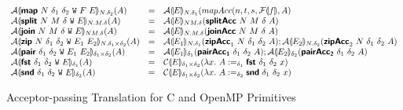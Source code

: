 \begin{figure}
\begin{displaymath}
\begin{array}{lcl}
      \mathcal{A}\llparenthesis \bm{\mathsf{map}}~N~\delta_1~\delta_2~\mathtt{W}~F~E \rrparenthesis_{N.\delta_2}(A)
        &=& \mathcal{A}\llparenthesis E \rrparenthesis_{N.\delta_1}(mapAcc(n, t, s, \mathcal{F}\llparenthesis f \rrparenthesis, A)
      \\
      \mathcal{A}\llparenthesis \bm{\mathsf{split}}~N~M~\delta~\mathtt{W}~E \rrparenthesis_{N.M.\delta}(A)
      &=& \mathcal{A}\llparenthesis E \rrparenthesis_{NM.\delta}(\bm{\mathsf{splitAcc}}~N~M~\delta~A)
      \\
      \mathcal{A}\llparenthesis \bm{\mathsf{join}}~N~M~\delta~\mathtt{W}~E \rrparenthesis_{NM.\delta}(A)
      &=& \mathcal{A}\llparenthesis E \rrparenthesis_{N.M.\delta}(\bm{\mathsf{joinAcc}}~N~M~\delta~A)
      \\
      \mathcal{A}\llparenthesis \bm{\mathsf{zip}}~N~\delta_1~\delta_2~\mathtt{W}~E_1~E_2 \rrparenthesis_{N.\delta_1\times\delta_2}(A)
      &=& \mathcal{A}\llparenthesis E_1 \rrparenthesis_{N.\delta_1}(\bm{\mathsf{zipAcc}}_1~N~\delta_1~\delta_2~A);
          \mathcal{A}\llparenthesis E_2 \rrparenthesis_{N.\delta_2}(\bm{\mathsf{zipAcc}}_2~N~\delta_1~\delta_2~A)
      \\
      \mathcal{A}\llparenthesis \bm{\mathsf{pair}}~\delta_1~\delta_2~\mathtt{W}~E_1~E_2 \rrparenthesis_{\delta_1\times\delta_2}(A)
      &=& \mathcal{A}\llparenthesis E_1 \rrparenthesis_{\delta_1}(\bm{\mathsf{pairAcc_1}}~\delta_1~\delta_2~A);
          \mathcal{A}\llparenthesis E_2 \rrparenthesis_{\delta_2}(\bm{\mathsf{pairAcc_2}}~\delta_1~\delta_2~A)
      \\
      \mathcal{A}\llparenthesis \bm{\mathsf{fst}}~{\delta_1}~{\delta_2}~\mathtt{W}~E \rrparenthesis_{\delta_1}(A)
      &=& \mathcal{C}\llparenthesis E \rrparenthesis_{\delta_1\times\delta_2}(\lambda x.~A :=_{\delta_1} \bm{\mathsf{fst}}~{\delta_1}~{\delta_2}~x)
      \\
      \mathcal{A}\llparenthesis \bm{\mathsf{snd}}~{\delta_1}~{\delta_2}~\mathtt{W}~E \rrparenthesis_{\delta_2}(A)
      &=& \mathcal{C}\llparenthesis E \rrparenthesis_{\delta_1\times\delta_2}(\lambda x.~A :=_{\delta_2} \bm{\mathsf{snd}}~{\delta_1}~{\delta_2}~x)
    \end{array}
  \end{displaymath}
  \caption{Acceptor-passing Translation for C and OpenMP Primitives}\label{fig:acc-trans}
\end{figure}

